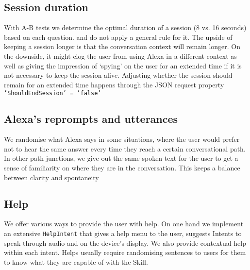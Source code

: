 \subsection*{Session duration}
\label{sessionduration}
With A-B tests we determine the optimal duration of a session (8 vs. 16 seconds) based on each question. and do not apply a general rule for it. The upside of keeping a session longer is that the conversation context will remain longer. On the downside, it might clog the user from using Alexa in a different context as well as giving the impression of `spying' on the user for an extended time if it is not necessary to keep the session alive. Adjusting whether the session should remain for an extended time happens through the JSON request property \texttt{{'ShouldEndSession' = 'false'}}


\subsection*{Alexa's reprompts and utterances}
We randomise what Alexa says in some situations, where the user would prefer not to hear the same answer every time they reach a certain conversational path. In other path junctions, we give out the same spoken text for the user to get a sense of familiarity on where they are in the conversation. This keeps a balance between clarity and spontaneity 


\subsection*{Help}
We offer various ways to provide the user with help. On one hand we implement an extensive \texttt{HelpIntent} that gives a help menu to the user, suggests Intents to speak through audio and on the device's display. We also provide contextual help within each intent. Helps usually require randomising sentences to users for them to know what they are capable of with the Skill.


%
%
%
%	
%
%
%
%


